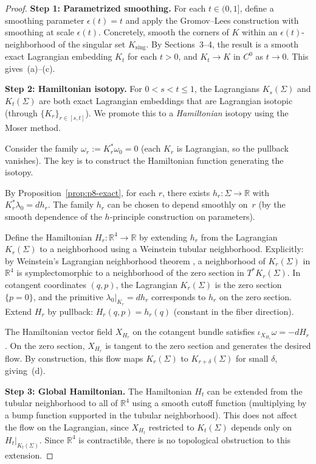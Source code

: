 \begin{proof}
\textbf{Step 1: Parametrized smoothing.}
For each $t\in(0,1]$, define a smoothing parameter $\epsilon(t) = t$ and
apply the Gromov--Lees construction with smoothing at scale $\epsilon(t)$.
Concretely, smooth the corners of $K$ within an $\epsilon(t)$-neighborhood
of the singular set $K_{\mathrm{sing}}$. By Sections~3--4, the result is
a smooth exact Lagrangian embedding $K_t$ for each $t>0$, and
$K_t\to K$ in $C^0$ as $t\to 0$. This gives~(a)--(c).

\textbf{Step 2: Hamiltonian isotopy.}
For $0 < s < t \le 1$, the Lagrangians $K_s(\Sigma)$ and $K_t(\Sigma)$
are both exact Lagrangian embeddings that are Lagrangian isotopic (through
$\{K_r\}_{r\in[s,t]}$). We promote this to a \emph{Hamiltonian} isotopy
using the Moser method.

Consider the family $\omega_r := K_r^*\omega_0 = 0$ (each $K_r$ is
Lagrangian, so the pullback vanishes). The key is to construct the
Hamiltonian function generating the isotopy.

By Proposition~\ref{prop:p8-exact}, for each $r$, there exists
$h_r: \Sigma\to\mathbb{R}$ with $K_r^*\lambda_0 = dh_r$. The family $h_r$
can be chosen to depend smoothly on~$r$ (by the smooth dependence of the
$h$-principle construction on parameters).

Define the Hamiltonian $H_r: \mathbb{R}^4\to\mathbb{R}$ by extending $h_r$
from the Lagrangian $K_r(\Sigma)$ to a neighborhood using a Weinstein tubular
neighborhood. Explicitly: by Weinstein's Lagrangian neighborhood theorem
\cite{Weinstein71}, a neighborhood of $K_r(\Sigma)$ in $\mathbb{R}^4$ is
symplectomorphic to a neighborhood of the zero section in
$T^*K_r(\Sigma)$. In cotangent coordinates $(q,p)$, the Lagrangian
$K_r(\Sigma)$ is the zero section $\{p=0\}$, and the primitive
$\lambda_0|_{K_r} = dh_r$ corresponds to $h_r$ on the zero section.
Extend $H_r$ by pullback: $H_r(q,p) = h_r(q)$ (constant in the fiber
direction).

The Hamiltonian vector field $X_{H_r}$ on the cotangent bundle satisfies
$\iota_{X_{H_r}}\omega = -dH_r$. On the zero section, $X_{H_r}$ is tangent
to the zero section and generates the desired flow. By construction, this
flow maps $K_r(\Sigma)$ to $K_{r+\delta}(\Sigma)$ for small $\delta$,
giving~(d).

\textbf{Step 3: Global Hamiltonian.}
The Hamiltonian $H_t$ can be extended from the tubular neighborhood to all
of $\mathbb{R}^4$ using a smooth cutoff function (multiplying by a bump
function supported in the tubular neighborhood). This does not affect the
flow on the Lagrangian, since $X_{H_t}$ restricted to $K_t(\Sigma)$
depends only on $H_t|_{K_t(\Sigma)}$. Since $\mathbb{R}^4$ is contractible,
there is no topological obstruction to this extension.
\end{proof}

